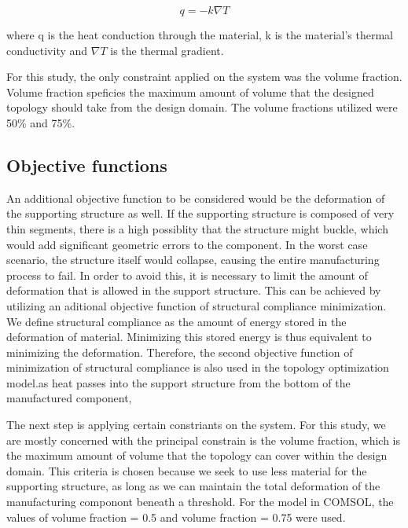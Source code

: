 \documentclass[../main.tex]{subfiles}
\begin{document}
\begin{equation}
  \label{eq:Fourier Law}
  q = -k \nabla T
\end{equation}

where q is the heat conduction through the material, k is the material's thermal conductivity and $\nabla T$ is the thermal gradient. 

For this study, the only constraint applied on the system was the volume fraction. Volume fraction speficies the maximum amount of volume that the designed topology should take from the design domain. The volume fractions utilized were 50\% and 75\%.


\subsection{Objective functions}

An additional objective function to be considered would be the deformation of the supporting structure as well. If the supporting structure is composed of very thin segments, there is a high possiblity that the structure might buckle, which would add significant geometric errors to the component. In the worst case scenario, the structure itself would collapse, causing the entire manufacturing process to fail. In order to avoid this, it is necessary to limit the amount of deformation that is allowed in the support structure. This can be achieved by utilizing an aditional objective function of structural compliance minimization. We define structural compliance as the amount of energy stored in the deformation of material. Minimizing this stored energy is thus equivalent to minimizing the deformation.  Therefore, the second objective function of minimization of structural compliance is also used in the topology optimization model.as heat passes into the support structure from the bottom of the manufactured component,



The next step is applying certain constriants on the system. For this study, we are mostly concerned with the principal constrain is the volume fraction, which is the maximum amount of volume that the topology can cover within the design domain. This criteria is chosen because we seek to use less material for the supporting structure, as long as we can maintain the total deformation of the manufacturing componont beneath a threshold. For the model in COMSOL, the values of volume fraction = 0.5 and volume fraction = 0.75 were used.
\end{document}
